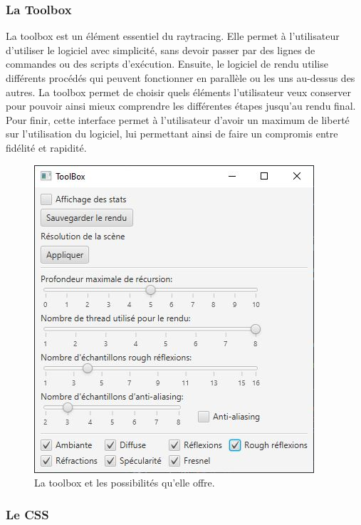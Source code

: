 \subsubsection{La Toolbox}

La toolbox est un élément essentiel du raytracing. Elle permet à l'utilisateur d'utiliser le logiciel avec simplicité, sans devoir passer par des lignes de commandes ou des scripts d'exécution.
Ensuite, le logiciel de rendu utilise différents procédés qui peuvent fonctionner en parallèle ou les uns au-dessus des autres. La toolbox permet de choisir quels éléments l'utilisateur veux conserver pour pouvoir ainsi mieux comprendre les différentes étapes jusqu'au rendu final.
Pour finir, cette interface permet à l'utilisateur d'avoir un maximum de liberté sur l'utilisation du logiciel, lui permettant ainsi de faire un compromis entre fidélité et rapidité.

\begin{figure}[h]
   \begin{center}
       \includegraphics[scale=0.8]{img/rt/toolbox.jpg}
   \end{center}
   \caption{La toolbox et les possibilités qu'elle offre.}
\end{figure}
\FloatBarrier



\subsubsection{Le CSS}

